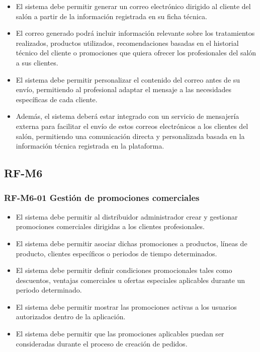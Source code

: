\begin{itemize}
    \item El sistema debe permitir generar un correo electrónico dirigido al cliente del salón a partir de la información registrada en su ficha técnica.
    \item El correo generado podrá incluir información relevante sobre los tratamientos realizados, productos utilizados, recomendaciones basadas en el historial técnico del cliente o promociones que quiera ofrecer los profesionales del salón a sus clientes.
    \item El sistema debe permitir personalizar el contenido del correo antes de su envío, permitiendo al profesional adaptar el mensaje a las necesidades específicas de cada cliente.
    \item Además, el sistema deberá estar integrado con un servicio de mensajería externa para facilitar el envío de estos correos electrónicos a los clientes del salón, permitiendo una comunicación directa y personalizada basada en la información técnica registrada en la plataforma.
\end{itemize}

\subsection{RF-M6}

\vspace{-0.75em}
\subsubsection{RF-M6-01 Gestión de promociones comerciales}
\vspace{-1em}

\begin{itemize}
    \item El sistema debe permitir al distribuidor administrador crear y gestionar promociones comerciales dirigidas a los clientes profesionales.
    \item El sistema debe permitir asociar dichas promociones a productos, líneas de producto, clientes específicos o periodos de tiempo determinados.
    \item El sistema debe permitir definir condiciones promocionales tales como descuentos, ventajas comerciales u ofertas especiales aplicables durante un periodo determinado.
    \item El sistema debe permitir mostrar las promociones activas a los usuarios autorizados dentro de la aplicación.
    \item El sistema debe permitir que las promociones aplicables puedan ser consideradas durante el proceso de creación de pedidos.
\end{itemize}


